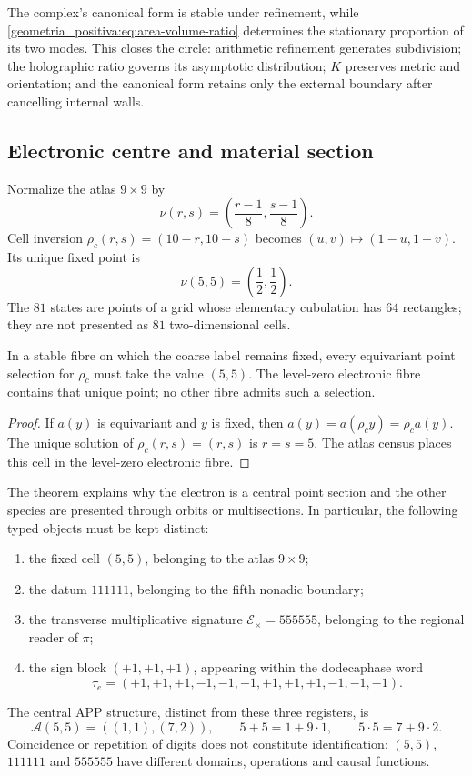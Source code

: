 The complex's canonical form is stable under refinement, while \eqref{geometria_positiva:eq:area-volume-ratio} determines the stationary proportion of its two modes. This closes the circle: arithmetic refinement generates subdivision; the holographic ratio governs its asymptotic distribution; \(K\) preserves metric and orientation; and the canonical form retains only the external boundary after cancelling internal walls.

\subsection{Electronic centre and material section}

Normalize the atlas \(9\times9\) by
\[
 \nu(r,s)=\left(\frac{r-1}{8},\frac{s-1}{8}\right).
\]
Cell inversion \(\rho_c(r,s)=(10-r,10-s)\) becomes \((u,v)\mapsto(1-u,1-v)\). Its unique fixed point is
\begin{equation}
 \nu(5,5)=\left(\frac12,\frac12\right).
 \label{geometria_positiva:eq:electron-center}
\end{equation}
The \(81\) states are points of a grid whose elementary cubulation has \(64\) rectangles; they are not presented as \(81\) two-dimensional cells.

\begin{theorem}
\label{geometria_positiva:thm:electron-equivariant-section} In a stable fibre on which the coarse label remains fixed, every equivariant point selection for \(\rho_c\) must take the value \((5,5)\). The level-zero electronic fibre contains that unique point; no other fibre admits such a selection.
\end{theorem}
\begin{proof}
If \(a(y)\) is equivariant and \(y\) is fixed, then \(a(y)=a(\rho_cy)=\rho_ca(y)\). The unique solution of \(\rho_c(r,s)=(r,s)\) is \(r=s=5\). The atlas census places this cell in the level-zero electronic fibre.
\end{proof}

The theorem explains why the electron is a central point section and the other species are presented through orbits or multisections. In particular, the following typed objects must be kept distinct:
\begin{enumerate}
 \item the fixed cell \((5,5)\), belonging to the atlas \(9\times9\);
 \item the datum \(111111\), belonging to the fifth nonadic boundary;
 \item the transverse multiplicative signature \(\mathcal E_{\times}=555555\), belonging to the regional reader of \(\pi\);
 \item the sign block \((+1,+1,+1)\), appearing within the dodecaphase word
       \[
        \tau_e=(+1,+1,+1,-1,-1,-1,+1,+1,+1,-1,-1,-1).
       \]
\end{enumerate}
The central APP structure, distinct from these three registers, is
\[
 \mathcal A(5,5)=((1,1),(7,2)),\qquad
 5+5=1+9\cdot1,\qquad 5\cdot5=7+9\cdot2.
\]
Coincidence or repetition of digits does not constitute identification: \((5,5)\), \(111111\) and \(555555\) have different domains, operations and causal functions.

